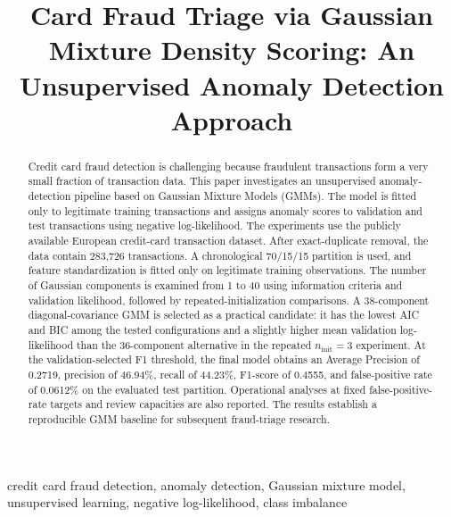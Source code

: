 \documentclass[conference]{IEEEtran}
\begin{document}
\title{Card Fraud Triage via Gaussian Mixture Density Scoring: An Unsupervised Anomaly Detection Approach}

\author{
}

\maketitle

\begin{abstract}
Credit card fraud detection is challenging because fraudulent transactions form a very small fraction of transaction data. This paper investigates an unsupervised anomaly-detection pipeline based on Gaussian Mixture Models (GMMs). The model is fitted only to legitimate training transactions and assigns anomaly scores to validation and test transactions using negative log-likelihood. The experiments use the publicly available European credit-card transaction dataset. After exact-duplicate removal, the data contain 283,726 transactions. A chronological 70/15/15 partition is used, and feature standardization is fitted only on legitimate training observations. The number of Gaussian components is examined from 1 to 40 using information criteria and validation likelihood, followed by repeated-initialization comparisons. A 38-component diagonal-covariance GMM is selected as a practical candidate: it has the lowest AIC and BIC among the tested configurations and a slightly higher mean validation log-likelihood than the 36-component alternative in the repeated $n_{\mathrm{init}}=3$ experiment. At the validation-selected F1 threshold, the final model obtains an Average Precision of 0.2719, precision of 46.94\%, recall of 44.23\%, F1-score of 0.4555, and false-positive rate of 0.0612\% on the evaluated test partition. Operational analyses at fixed false-positive-rate targets and review capacities are also reported. The results establish a reproducible GMM baseline for subsequent fraud-triage research.
\end{abstract}

\begin{IEEEkeywords}
credit card fraud detection, anomaly detection, Gaussian mixture model, unsupervised learning, negative log-likelihood, class imbalance
\end{IEEEkeywords}
\end{document}
